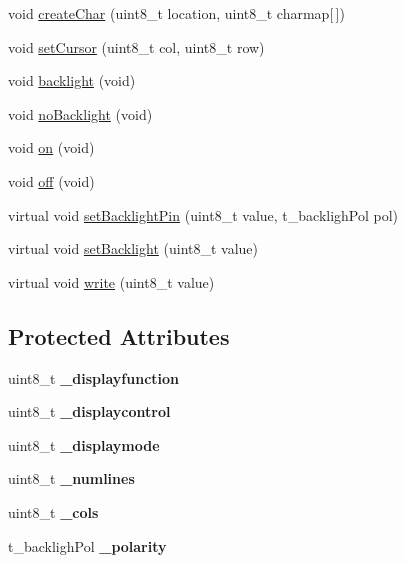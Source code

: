 \begin{DoxyCompactItemize}
\item 
void \hyperlink{class_l_c_d_a91cba8f93c692abcddf8bc3de58d2d3a}{create\+Char} (uint8\+\_\+t location, uint8\+\_\+t charmap\mbox{[}$\,$\mbox{]})
\item 
void \hyperlink{class_l_c_d_a48220450fd152b25994eb7d0ba340e8d}{set\+Cursor} (uint8\+\_\+t col, uint8\+\_\+t row)
\item 
void \hyperlink{class_l_c_d_aba8867fe2210cbfa8db869208709be10}{backlight} (void)
\item 
void \hyperlink{class_l_c_d_a2a331b4e142734411b2f1cfaffe7a488}{no\+Backlight} (void)
\item 
void \hyperlink{class_l_c_d_a718da3a638deb59bd1c7a5222a52d98a}{on} (void)
\item 
void \hyperlink{class_l_c_d_a191639be183be1476c9bfe6d455d23b2}{off} (void)
\item 
virtual void \hyperlink{class_l_c_d_a53f4ee9b39d9ab3d7ae4d9f8dedca3bc}{set\+Backlight\+Pin} (uint8\+\_\+t value, t\+\_\+backligh\+Pol pol)
\item 
virtual void \hyperlink{class_l_c_d_a3305570d7b37eb93f2cf840263c15828}{set\+Backlight} (uint8\+\_\+t value)
\item 
virtual void \hyperlink{class_l_c_d_a2d89cc2e62f72afb5f15a7fd812900e3}{write} (uint8\+\_\+t value)
\end{DoxyCompactItemize}
\subsection*{Protected Attributes}
\begin{DoxyCompactItemize}
\item 
\hypertarget{class_l_c_d_aef093ba3f8e1016267b40ac235a0fa0f}{}uint8\+\_\+t {\bfseries \+\_\+displayfunction}\label{class_l_c_d_aef093ba3f8e1016267b40ac235a0fa0f}

\item 
\hypertarget{class_l_c_d_ae47a0e2eff74431a39774b788d5761f4}{}uint8\+\_\+t {\bfseries \+\_\+displaycontrol}\label{class_l_c_d_ae47a0e2eff74431a39774b788d5761f4}

\item 
\hypertarget{class_l_c_d_a726b9a68d091dd8683a18e83f3a8fd3c}{}uint8\+\_\+t {\bfseries \+\_\+displaymode}\label{class_l_c_d_a726b9a68d091dd8683a18e83f3a8fd3c}

\item 
\hypertarget{class_l_c_d_ac1374911fb145fea430c21092ada0c06}{}uint8\+\_\+t {\bfseries \+\_\+numlines}\label{class_l_c_d_ac1374911fb145fea430c21092ada0c06}

\item 
\hypertarget{class_l_c_d_a88b16ea0e5c7d1cabc5007d48bcbd2b0}{}uint8\+\_\+t {\bfseries \+\_\+cols}\label{class_l_c_d_a88b16ea0e5c7d1cabc5007d48bcbd2b0}

\item 
\hypertarget{class_l_c_d_a990338759d2abe10b0fb1743b7789566}{}t\+\_\+backligh\+Pol {\bfseries \+\_\+polarity}\label{class_l_c_d_a990338759d2abe10b0fb1743b7789566}

\end{DoxyCompactItemize}



